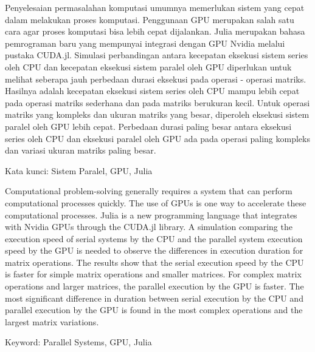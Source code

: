 \documentclass{skripsiactugm}
\begin{document}


\begin{abstractind}
	Penyelesaian permasalahan komputasi umumnya memerlukan sistem yang cepat dalam melakukan proses komputasi. Penggunaan GPU merupakan salah satu cara agar proses komputasi bisa lebih cepat dijalankan. Julia merupakan bahasa pemrograman baru yang mempunyai integrasi dengan GPU Nvidia melalui pustaka CUDA.jl. Simulasi perbandingan antara kecepatan eksekusi sistem series oleh CPU dan kecepatan eksekusi sistem paralel oleh GPU diperlukan untuk melihat seberapa jauh perbedaan durasi eksekusi pada operasi - operasi matriks. Hasilnya adalah kecepatan eksekusi sistem series oleh CPU mampu lebih cepat pada operasi matriks sederhana dan pada matriks berukuran kecil. Untuk operasi matriks yang kompleks dan ukuran matriks yang besar, diperoleh eksekusi sistem paralel oleh GPU lebih cepat. Perbedaan durasi paling besar antara eksekusi series oleh CPU dan eksekusi paralel oleh GPU ada pada operasi paling kompleks dan variasi ukuran matriks paling besar.


	Kata kunci: Sistem Paralel, GPU, Julia
\end{abstractind}

\begin{abstracteng}
	Computational problem-solving generally requires a system that can perform computational processes quickly. The use of GPUs is one way to accelerate these computational processes. Julia is a new programming language that integrates with Nvidia GPUs through the CUDA.jl library. A simulation comparing the execution speed of serial systems by the CPU and the parallel system execution speed by the GPU is needed to observe the differences in execution duration for matrix operations. The results show that the serial execution speed by the CPU is faster for simple matrix operations and smaller matrices. For complex matrix operations and larger matrices, the parallel execution by the GPU is faster. The most significant difference in duration between serial execution by the CPU and parallel execution by the GPU is found in the most complex operations and the largest matrix variations.

	Keyword: Parallel Systems, GPU, Julia
\end{abstracteng}
\end{document}
